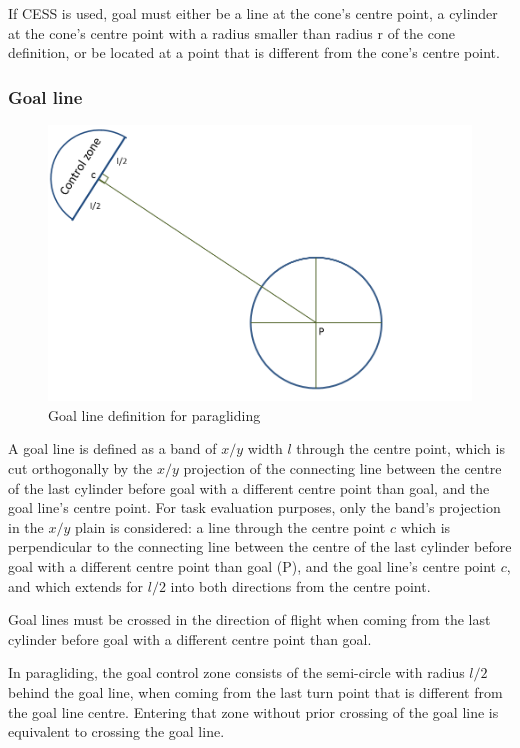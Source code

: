 \documentclass{article}
\begin{document}
\begin{pg}
If CESS is used, goal must either be a line at the cone’s centre point,
a cylinder at the cone’s centre point with a radius smaller than radius r of
the cone definition, or be located at a point that is different from the cone’s
centre point.
\end{pg}

\subsubsection{Goal line}
\begin{figure}[h]
    \includegraphics[scale=0.8]{img/goal-line.png}
    \caption{Goal line definition for paragliding}
\end{figure}

A goal line is defined as a band of \(x/y\) width \(l\) through the centre
point, which is cut orthogonally by the \(x/y\) projection of the connecting
line between the centre of the last cylinder before goal with a different
centre point than goal, and the goal line’s centre point. For task evaluation
purposes, only the band’s projection in the \(x/y\) plain is considered: a line
through the centre point \(c\) which is perpendicular to the connecting line
between the centre of the last cylinder before goal with a different centre
point than goal (P), and the goal line’s centre point \(c\), and which extends
for \(l/2\) into both directions from the centre point.

Goal lines must be crossed in the direction of flight when coming from the last
cylinder before goal with a different centre point than goal.

\begin{pg}
In paragliding, the goal control zone consists of the semi-circle with radius
\(l/2\) behind the goal line, when coming from the last turn point that is
different from the goal line centre. Entering that zone without prior crossing
of the goal line is equivalent to crossing the goal line.
\end{pg}
\end{document}
